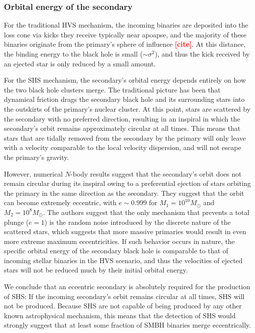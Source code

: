 \documentclass[a4paper,twocolumn]{emulateapj}
\newcommand{\colr}[1]{{\bf \textcolor{red}{[#1]}}}
\begin{document}
\subsubsection{Orbital energy of the secondary}
For the traditional HVS mechanism, the incoming binaries are deposited into the loss cone via kicks they receive typically near apoapse, and the majority of these binaries originate from the primary's sphere of influence \colr{cite}. At this distance, the binding energy to the black hole is small ($\sim \sigma^{2}$), and thus the kick received by an ejected star is only reduced by a small amount.

For the SHS mechanism, the secondary's orbital energy depends entirely on how the two black hole clusters merge. The traditional picture has been that dynamical friction drags the secondary black hole and its surrounding stars into the outskirts of the primary's nuclear cluster. At this point, stars are scattered by the secondary with no preferred direction, resulting in an inspiral in which the secondary's orbit remains approximately circular at all times. This means that stars that are tidally removed from the secondary by the primary will only leave with a velocity comparable to the local velocity dispersion, and will not escape the primary's gravity.

However, numerical $N$-body results \citep{Iwasawa:2011cv,Khan:2012ir} suggest that the secondary's orbit does not remain circular during its inspiral owing to a preferential ejection of stars orbiting the primary in the same direction as the secondary. They suggest that the orbit can become extremely eccentric, with $e \sim 0.999$ for $M_{1} = 10^{10} M_{\odot}$ and $M_{2} = 10^{8} M_{\odot}$. The authors suggest that the only mechanism that prevents a total plunge ($e = 1$) is the random noise introduced by the discrete nature of the scattered stars, which suggests that more massive primaries would result in even more extreme maximum eccentricities. If such behavior occurs in nature, the specific orbital energy of the secondary black hole is comparable to that of incoming stellar binaries in the HVS scenario, and thus the velocities of ejected stars will not be reduced much by their initial orbital energy.

We conclude that an eccentric secondary is absolutely required for the production of SHS: If the incoming secondary's orbit remains circular at all times, SHS will not be produced. Because SHS are not capable of being produced by any other known astrophysical mechanism, this means that the detection of SHS would strongly suggest that at least some fraction of SMBH binaries merge eccentrically.
\end{document}

